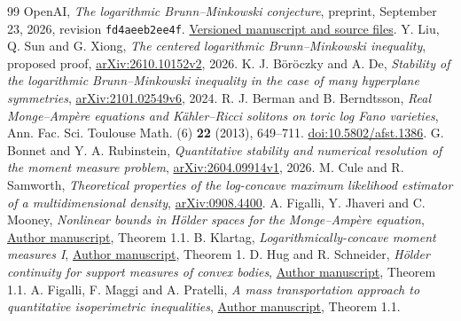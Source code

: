 \documentclass[11pt,reqno]{amsart}
\numberwithin{equation}{section}
\theoremstyle{remark}
\theoremstyle{definition}
\begin{document}
\begin{thebibliography}{99}
 OpenAI, \emph{The logarithmic Brunn--Minkowski conjecture},
preprint, September 23, 2026, revision
\texttt{fd4aeeb2ee4f}.
\href{https://github.com/openai/math/tree/fd4aeeb2ee4fc729c18d98444fed42fd0529eeeb/preprints/The-logarithmic-Brunn-Minkowski-conjecture-September-23-2026}{Versioned manuscript and source files}.
 Y. Liu, Q. Sun and G. Xiong,
\emph{The centered logarithmic Brunn--Minkowski inequality}, proposed proof,
\href{https://arxiv.org/abs/2610.10152v2}{arXiv:2610.10152v2}, 2026.
 K. J. B\"or\"oczky and A. De,
\emph{Stability of the logarithmic Brunn--Minkowski inequality in the case of
many hyperplane symmetries},
\href{https://arxiv.org/abs/2101.02549v6}{arXiv:2101.02549v6}, 2024.
 R. J. Berman and B. Berndtsson,
\emph{Real Monge--Amp\`ere equations and K\"ahler--Ricci solitons on toric
log Fano varieties}, Ann. Fac. Sci. Toulouse Math. (6) \textbf{22} (2013),
649--711. \href{https://doi.org/10.5802/afst.1386}{doi:10.5802/afst.1386}.
 G. Bonnet and Y. A. Rubinstein,
\emph{Quantitative stability and numerical resolution of the moment measure
problem}, \href{https://arxiv.org/abs/2604.09914v1}{arXiv:2604.09914v1}, 2026.
 M. Cule and R. Samworth,
\emph{Theoretical properties of the log-concave maximum likelihood estimator
of a multidimensional density},
\href{https://arxiv.org/abs/0908.4400}{arXiv:0908.4400}.
 A. Figalli, Y. Jhaveri and C. Mooney,
\emph{Nonlinear bounds in H\"older spaces for the Monge--Amp\`ere equation},
\href{https://people.math.ethz.ch/~afigalli/papers-pdf/Nonlinear-Bounds-in-Holder-Spaces-for-the-Monge-Ampere-Equation.pdf}{Author manuscript}, Theorem 1.1.
 B. Klartag,
\emph{Logarithmically-concave moment measures I},
\href{https://www.math.tau.ac.il/~klartagb/papers/lc_moment.pdf}{Author manuscript}, Theorem 1.
 D. Hug and R. Schneider,
\emph{H\"older continuity for support measures of convex bodies},
\href{https://home.mathematik.uni-freiburg.de/rschnei/ArchivHugSchneider.pdf}{Author manuscript}, Theorem 1.1.
 A. Figalli, F. Maggi and A. Pratelli,
\emph{A mass transportation approach to quantitative isoperimetric inequalities},
\href{https://people.math.ethz.ch/~afigalli/papers-pdf/A-mass-transportation-approach-to-quantitative-isoperimetric-inequalities.pdf}{Author manuscript}, Theorem 1.1.
\end{thebibliography}
\end{document}
